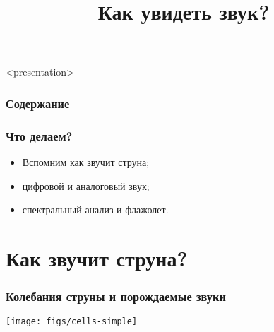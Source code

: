

\title[Как увидеть звук?]{Как увидеть звук?}



\begin{frame}<presentation>
    \frametitle{Содержание}
    \tableofcontents
\end{frame}

\begin{frame}
    \frametitle{Что делаем?}

	\begin{itemize}
		\item Вспомним как звучит струна;
		\item цифровой и аналоговый звук;
		\item спектральный анализ и флажолет.
	\end{itemize}
\end{frame}


\section{Как звучит струна?}

\begin{frame}
    \frametitle{Колебания струны и порождаемые звуки}

    \begin{center}
        \texttt{[image: figs/cells-simple]}
    \end{center}
\end{frame}


